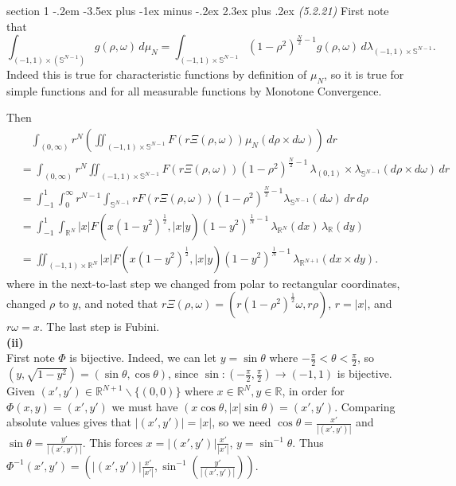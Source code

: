\documentclass[12pt]{article}
\makeatletter
\theoremstyle{norm}
\newcommand{\R}[0]{\mathbb{R}}
\newcommand{\bS}[0]{\mathbb{S}}
\newcommand{\rc}[1]{\frac{1}{#1}}
\newcommand{\la}[0]{\lambda}
\newcommand{\rh}[0]{\rho}
\newcommand{\te}[0]{\theta}
\newcommand{\om}[0]{\omega}
\newcommand{\pa}[1]{\left( {#1} \right)}
\newcommand{\subprob}[1]{\noindent\textbf{#1}\\}
\newcommand{\pf}[2]{\pa{\frac{#1}{#2}}}
\newcommand{\bs}[0]{\backslash}
\newcommand{\iy}[0]{\infty}
\newenvironment{problem}{\@startsection
       {section}
       {1}
       {-.2em}
       {-3.5ex plus -1ex minus -.2ex}
       {2.3ex plus .2ex}
       {\pagebreak[3]%
       \large\bf\noindent{Problem }
       }
       }
       {%
       }
\makeatother
\begin{document}
\begin{problem}{\it (5.2.21)}
First note that 
\[\int_{(-1,1)\times (\bS^{N-1})} g(\rh,\om)\,d\mu_N=\int_{(-1,1)\times \bS^{N-1}} (1-\rh^2)^{\frac N2-1}g(\rh,\om)\,d\la_{(-1,1)\times \bS^{N-1}}.\]
Indeed this is true for characteristic functions by definition of $\mu_N$, so it is true for simple functions and for all measurable functions by Monotone Convergence.

Then
\begin{align}
\nonumber
&\quad\int_{(0,\iy)} r^N \pa{
\iint_{(-1,1)\times \bS^{N-1}} F(r\Xi(\rh,\om))\mu_N(d\rh\times d\om)}\,dr\\
\nonumber
&=\int_{(0,\iy)}r^N\iint_{(-1,1)\times\bS^{N-1}} F(r\Xi(\rh,\om)) (1-\rh^2)^{\frac N2-1}\,\la_{(0,1)}\times \la_{\bS^{N-1}}(d\rh\times d\om)\,dr\\
\nonumber
&=\int_{-1}^1\int_0^{\iy} r^{N-1} \int_{\bS^{N-1}} rF(r\Xi(\rh,\om)) (1-\rh^2)^{\frac N2-1} \la_{\bS^{N-1}}(d\om)\,dr\,d\rh\\
\nonumber
&=\int_{-1}^1 \int_{\R^N} |x|F(x(1-y^2)^{\rc 2}, |x| y)(1-y^2)^{\rc N-1} \,\la_{\R^N} (dx)\,\la_{\R}(dy)\\
\label{p5-2-1}
&=\iint_{(-1,1)\times\R^N} |x|F(x(1-y^2)^{\rc 2}, |x| y)(1-y^2)^{\rc N-1} \,\la_{\R^{N+1}}(dx\times dy).
\end{align}
where in the next-to-last step we changed from polar to rectangular coordinates, changed $\rh$ to $y$, and noted that $r\Xi(\rh,\om)=(r(1-\rh^2)^{\rc 2} \om, r\rh)$, $r=|x|$, and $r\om =x$. The last step is Fubini.\\

\subprob{(ii)}
First note $\Phi$ is bijective. Indeed, we can let $y=\sin \theta$ where $-\frac{\pi}{2}< \theta<\frac{\pi}{2}$, so $(y,\sqrt{1-y^2})=(\sin\te,\cos\te)$, since 
$\sin:\pa{-\frac{\pi}{2},\frac{\pi}{2}}\to (-1,1)$ is bijective. Given $(x',y')\in \R^{N+1}\bs\{(0,0)\}$ where $x\in \R^N,y\in \R$, in order for $\Phi(x,y)=(x',y')$ 
we must have $(x\cos \theta, |x|\sin \theta)=(x',y')$. Comparing absolute 
values gives that $|(x',y')|=|x|$, so we need $\cos \theta=\frac{x'}{|(x',y')|}$ and $\sin \theta =\frac{y'}{|(x',y')|}$. 
This forces $x=|(x',y')|\frac{x'}{|x'|}$, $y=\sin^{-1}\theta$. Thus $\Phi^{-1}(x',y')=\pa{|(x',y')|\frac{x'}{|x'|},\sin^{-1}\pf{y'}{|(x',y')|}}$.


\end{problem}
\end{document}
